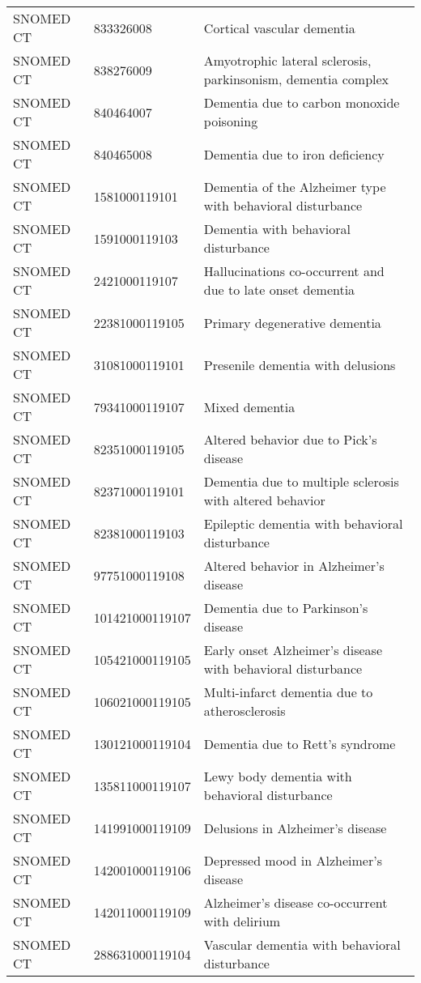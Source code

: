 \begin{longtable}{p{}p{}p{}}
  SNOMED CT & 833326008 & Cortical vascular dementia \\ 
  SNOMED CT & 838276009 & Amyotrophic lateral sclerosis, parkinsonism, dementia complex \\ 
  SNOMED CT & 840464007 & Dementia due to carbon monoxide poisoning \\ 
  SNOMED CT & 840465008 & Dementia due to iron deficiency \\ 
  SNOMED CT & 1581000119101 & Dementia of the Alzheimer type with behavioral disturbance \\ 
  SNOMED CT & 1591000119103 & Dementia with behavioral disturbance \\ 
  SNOMED CT & 2421000119107 & Hallucinations co-occurrent and due to late onset dementia \\ 
  SNOMED CT & 22381000119105 & Primary degenerative dementia \\ 
  SNOMED CT & 31081000119101 & Presenile dementia with delusions \\ 
  SNOMED CT & 79341000119107 & Mixed dementia \\ 
  SNOMED CT & 82351000119105 & Altered behavior due to Pick's disease \\ 
  SNOMED CT & 82371000119101 & Dementia due to multiple sclerosis with altered behavior \\ 
  SNOMED CT & 82381000119103 & Epileptic dementia with behavioral disturbance \\ 
  SNOMED CT & 97751000119108 & Altered behavior in Alzheimer's disease \\ 
  SNOMED CT & 101421000119107 & Dementia due to Parkinson's disease \\ 
  SNOMED CT & 105421000119105 & Early onset Alzheimer's disease with behavioral disturbance \\ 
  SNOMED CT & 106021000119105 & Multi-infarct dementia due to atherosclerosis \\ 
  SNOMED CT & 130121000119104 & Dementia due to Rett's syndrome \\ 
  SNOMED CT & 135811000119107 & Lewy body dementia with behavioral disturbance \\ 
  SNOMED CT & 141991000119109 & Delusions in Alzheimer's disease \\ 
  SNOMED CT & 142001000119106 & Depressed mood in Alzheimer's disease \\ 
  SNOMED CT & 142011000119109 & Alzheimer's disease co-occurrent with delirium \\ 
  SNOMED CT & 288631000119104 & Vascular dementia with behavioral disturbance \\ 

\end{longtable}

